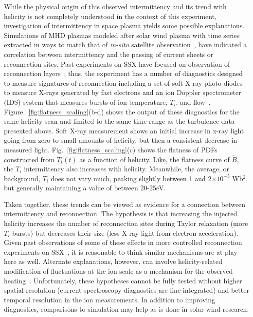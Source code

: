 \documentclass[aps,prl,amsmath,amssymb,reprint,superscriptaddress]{revtex4-1} %
\begin{document}
While the physical origin of this observed intermittency and its trend with helicity is not completely understood in the context of this experiment, investigation of intermittency in space plasma yields some possible explanations. Simulations of MHD plasmas modeled after solar wind plasma with time series extracted in ways to match that of \textit{in-situ} satellite observation~\cite{Greco08,Greco09}, have indicated a correlation between intermittency and the passing of current sheets or reconnection sites. Past experiments on SSX have focused on observation of reconnection layers~\cite{Gray10,brown12}; thus, the experiment has a number of diagnostics designed to measure signatures of reconnection including a set of soft X-ray photo-diodes~\cite{chaplin09} to measure X-rays generated by fast electrons and an ion Doppler spectrometer (IDS) system that measures bursts of ion temperature, $T_{i}$, and flow~\cite{brown12}. Figure.~\ref{fig:flatness_scaling}(b-d) shows the output of these diagnostics for the same helicity scan and limited to the same time range as the turbulence data presented above. Soft X-ray measurement shows an initial increase in x-ray light going from zero to small amounts of helicity, but then a consistent decrease in measured light. Fig.~\ref{fig:flatness_scaling}(c) shows the flatness of PDFs constructed from $T_{i}(t)$ as a function of helicity. Like, the flatness curve of $\dot{B}$, the $T_{i}$ intermittency also increases with helicity. Meanwhile, the average, or background, $T_{i}$ does not vary much, peaking slightly between 1 and 2$\times 10^{-5}$ Wb$^{2}$, but generally maintaining a value of between 20-25eV. 

Taken together, these trends can be viewed as evidence for a connection between intermittency and reconnection. The hypothesis is that increasing the injected helicity increases the number of reconnection sites during Taylor relaxation (more $T_{i}$ bursts) but decreases their size (less X-ray light from electron acceleration). Given past observations of some of these effects in more controlled reconnection experiments on SSX~\cite{brown12}, it is reasonable to think similar mechanisms are at play here as well. Alternate explanations, however, can involve helicity-related modification of fluctuations at the ion scale as a mechanism for the observed heating~\cite{wu13,osman11}. Unfortunately, these hypotheses cannot be fully tested without higher spatial resolution (current spectroscopy diagnostics are line-integrated) and better temporal resolution in the ion measurements. In addition to improving diagnostics, comparisons to simulation may help as is done in solar wind research.
\end{document}
